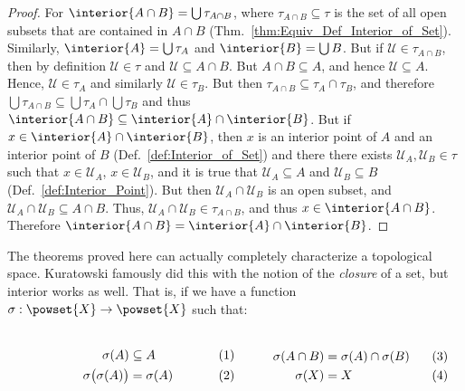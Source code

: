 \documentclass{article}                                                        %
\begin{document}
        \begin{proof}
            For $\interior{A\cap{B}}=\bigcup\tau_{A\cap{B}}$, where
            $\tau_{A\cap{B}}\subseteq\tau$ is the set of all open subsets that
            are contained in $A\cap{B}$
            (Thm.~\ref{thm:Equiv_Def_Interior_of_Set}). Similarly,
            $\interior{A}=\bigcup\tau_{A}$ and $\interior{B}=\bigcup{B}$.
            But if $\mathcal{U}\in\tau_{A\cap{B}}$, then by definition
            $\mathcal{U}\in\tau$ and $\mathcal{U}\subseteq{A}\cap{B}$.
            But $A\cap{B}\subseteq{A}$, and hence $\mathcal{U}\subseteq{A}$.
            Hence, $\mathcal{U}\in\tau_{A}$ and similarly
            $\mathcal{U}\in\tau_{B}$. But then
            $\tau_{A\cap{B}}\subseteq\tau_{A}\cap\tau_{B}$, and therefore
            $\bigcup\tau_{A\cap{B}}\subseteq\bigcup\tau_{A}\cap\bigcup\tau_{B}$
            and thus $\interior{A\cap{B}}\subseteq\interior{A}\cap\interior{B}$.
            But if $x\in\interior{A}\cap\interior{B}$, then $x$ is an interior
            point of $A$ and an interior point of $B$
            (Def.~\ref{def:Interior_of_Set}) and there there exists
            $\mathcal{U}_{A},\mathcal{U}_{B}\in\tau$ such that
            $x\in\mathcal{U}_{A}$, $x\in\mathcal{U}_{B}$, and it is true that
            $\mathcal{U}_{A}\subseteq{A}$ and $\mathcal{U}_{B}\subseteq{B}$
            (Def.~\ref{def:Interior_Point}). But
            then $\mathcal{U}_{A}\cap\mathcal{U}_{B}$ is an open subset, and
            $\mathcal{U}_{A}\cap\mathcal{U}_{B}\subseteq{A}\cap{B}$. Thus,
            $\mathcal{U}_{A}\cap\mathcal{U}_{B}\in\tau_{A\cap{B}}$, and thus
            $x\in\interior{A\cap{B}}$. Therefore
            $\interior{A\cap{B}}=\interior{A}\cap\interior{B}$.
        \end{proof}
        The theorems proved here can actually completely characterize a
        topological space. Kuratowski famously did this with the notion of the
        \textit{closure} of a set, but interior works as well. That is, if we
        have a function $\sigma:\powset{X}\rightarrow\powset{X}$ such that:
        \par
        \begin{subequations}
            \begin{minipage}[b]{0.49\textwidth}
                \centering
                \begin{align}
                    \sigma(A)&\subseteq{A}\\
                    \sigma\big(\sigma(A)\big)&=\sigma(A)
                \end{align}
            \end{minipage}
            \hfill
            \begin{minipage}[b]{0.49\textwidth}
                \centering
                \begin{align}
                    \sigma(A\cap{B})&=\sigma(A)\cap\sigma(B)\\
                    \label{eqn:Int_Op_Sigma_of_X_is_X}%
                    \sigma(X)&=X
                \end{align}
            \end{minipage}
        \end{subequations}
\end{document}
